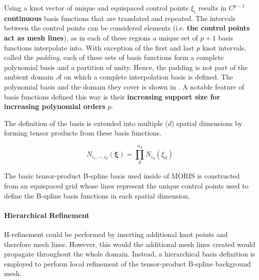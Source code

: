Using a knot vector of unique and equispaced control points $\xi_i$ results in \textbf{$C^{p-1}$ continuous} basis functions that are translated and repeated. The intervals between the control points can be considered elements (i.e. \textbf{the control points act as mesh lines}), as in each of these regions a unique set of $p+1$ basis functions interpolate into. With exception of the first and last $p$ knot intervals, called the \emph{padding}, each of these sets of basis functions form a complete polynomial basis and a partition of unity. Hence, the padding is not part of the ambient domain $\mathcal{A}$ on which a complete interpolation basis is defined. The polynomial basis and the domain they cover is shown in . A notable feature of basis functions defined this way is their \textbf{increasing support size for increasing polynomial orders} $p$.

The definition of the basis is extended into multiple ($d$) spatial dimensions by forming tensor products from these basis functions.

\begin{equation}
\label{eqn:tensor_product}
    N_{i_1, \cdots, i_d}(\bm{\xi}) = \prod_{d}^{n_d}N_{i_d}(\xi_d)
\end{equation}

The basic tensor-product B-spline basis used inside of MORIS is constructed from an equispaced grid whose lines represent the unique control points used to define the B-spline basis functions in each spatial dimension.

\paragraph{Hierarchical Refinement}
\hypertarget{hierarchical_refinement}{}

H-refinement could be performed by inserting additional knot points and therefore mesh lines. However, this would the additional mesh lines created would propagate throughout the whole domain.
Instead, a hierarchical basis definition is employed to perform local refinement of the tensor-product B-spline background mesh.


